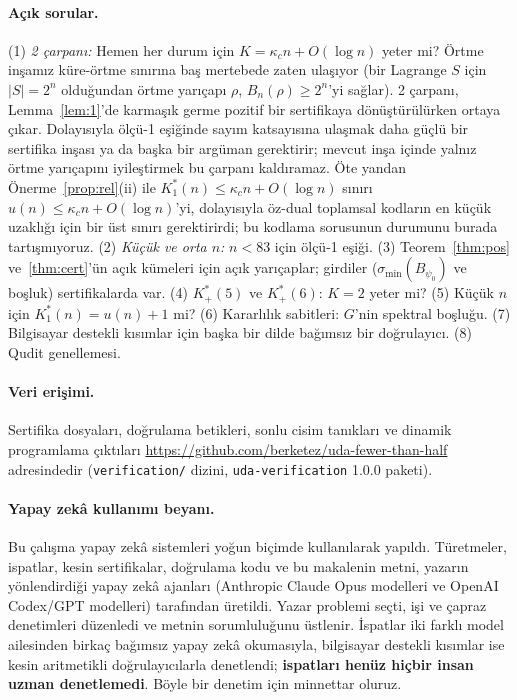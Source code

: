 \documentclass[aps,pra,onecolumn,superscriptaddress,nofootinbib,longbibliography,10pt]{revtex4-2}
\theoremstyle{definition}
\newcommand{\kc}{\kappa_c}
\newcommand{\Kp}{K^{*}_{+}}
\newcommand{\Ko}{K^{*}_{1}}
\begin{document}
\paragraph*{Açık sorular.}
(1) \emph{2 çarpanı:} Hemen her durum için $K=\kc n+O(\log n)$ yeter mi? Örtme inşamız küre-örtme sınırına baş mertebede zaten ulaşıyor (bir Lagrange $S$ için $|S|=2^n$ olduğundan örtme yarıçapı $\rho$, $B_n(\rho)\ge2^n$'yi sağlar). 2 çarpanı, Lemma~\ref{lem:1}'de karmaşık germe pozitif bir sertifikaya dönüştürülürken ortaya çıkar. Dolayısıyla ölçü-1 eşiğinde sayım katsayısına ulaşmak daha güçlü bir sertifika inşası ya da başka bir argüman gerektirir; mevcut inşa içinde yalnız örtme yarıçapını iyileştirmek bu çarpanı kaldıramaz. Öte yandan Önerme~\ref{prop:rel}(ii) ile $\Ko(n)\le\kc n+O(\log n)$ sınırı $u(n)\le\kc n+O(\log n)$'yi, dolayısıyla öz-dual toplamsal kodların en küçük uzaklığı için bir üst sınırı gerektirirdi; bu kodlama sorusunun durumunu burada tartışmıyoruz.
(2) \emph{Küçük ve orta $n$:} $n<83$ için ölçü-1 eşiği.
(3) Teorem~\ref{thm:pos} ve~\ref{thm:cert}'ün açık kümeleri için açık yarıçaplar; girdiler ($\sigma_{\min}(B_{\psi_0})$ ve boşluk) sertifikalarda var.
(4) $\Kp(5)$ ve $\Kp(6)$: $K=2$ yeter mi?
(5) Küçük $n$ için $\Ko(n)=u(n)+1$ mi?
(6) Kararlılık sabitleri: $G$'nin spektral boşluğu.
(7) Bilgisayar destekli kısımlar için başka bir dilde bağımsız bir doğrulayıcı.
(8) Qudit genellemesi.

\paragraph*{Veri erişimi.} Sertifika dosyaları, doğrulama betikleri, sonlu cisim tanıkları ve dinamik programlama çıktıları \url{https://github.com/berketez/uda-fewer-than-half} adresindedir (\texttt{verification/} dizini, \texttt{uda-verification} 1.0.0 paketi).

\paragraph*{Yapay zekâ kullanımı beyanı.} Bu çalışma yapay zekâ sistemleri yoğun biçimde kullanılarak yapıldı. Türetmeler, ispatlar, kesin sertifikalar, doğrulama kodu ve bu makalenin metni, yazarın yönlendirdiği yapay zekâ ajanları (Anthropic Claude Opus modelleri ve OpenAI Codex/GPT modelleri) tarafından üretildi. Yazar problemi seçti, işi ve çapraz denetimleri düzenledi ve metnin sorumluluğunu üstlenir. İspatlar iki farklı model ailesinden birkaç bağımsız yapay zekâ okumasıyla, bilgisayar destekli kısımlar ise kesin aritmetikli doğrulayıcılarla denetlendi; \textbf{ispatları henüz hiçbir insan uzman denetlemedi}. Böyle bir denetim için minnettar oluruz.
\end{document}
